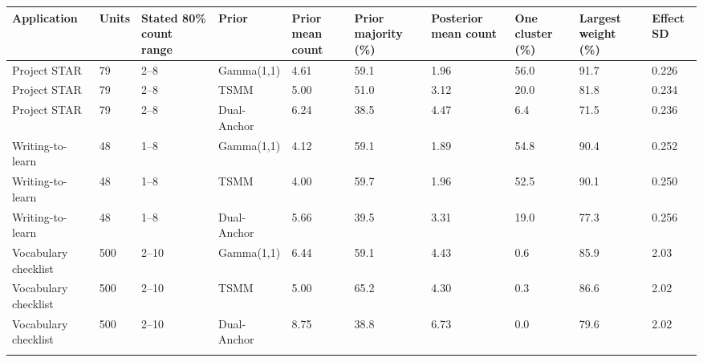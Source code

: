 \begin{longtable}{llllllllll}
\toprule
Application & Units & Stated 80\% count range & Prior & Prior mean count & Prior majority (\%) & Posterior mean count & One cluster (\%) & Largest weight (\%) & Effect SD \\
\midrule\endhead
Project STAR & 79 & 2–8 & Gamma(1,1) & 4.61 & 59.1 & 1.96 & 56.0 & 91.7 & 0.226 \\ \addlinespace[3pt]
Project STAR & 79 & 2–8 & TSMM & 5.00 & 51.0 & 3.12 & 20.0 & 81.8 & 0.234 \\ \addlinespace[3pt]
Project STAR & 79 & 2–8 & Dual-Anchor & 6.24 & 38.5 & 4.47 & 6.4 & 71.5 & 0.236 \\ \addlinespace[3pt]
Writing-to-learn & 48 & 1–8 & Gamma(1,1) & 4.12 & 59.1 & 1.89 & 54.8 & 90.4 & 0.252 \\ \addlinespace[3pt]
Writing-to-learn & 48 & 1–8 & TSMM & 4.00 & 59.7 & 1.96 & 52.5 & 90.1 & 0.250 \\ \addlinespace[3pt]
Writing-to-learn & 48 & 1–8 & Dual-Anchor & 5.66 & 39.5 & 3.31 & 19.0 & 77.3 & 0.256 \\ \addlinespace[3pt]
Vocabulary checklist & 500 & 2–10 & Gamma(1,1) & 6.44 & 59.1 & 4.43 & 0.6 & 85.9 & 2.03 \\ \addlinespace[3pt]
Vocabulary checklist & 500 & 2–10 & TSMM & 5.00 & 65.2 & 4.30 & 0.3 & 86.6 & 2.02 \\ \addlinespace[3pt]
Vocabulary checklist & 500 & 2–10 & Dual-Anchor & 8.75 & 38.8 & 6.73 & 0.0 & 79.6 & 2.02 \\ \addlinespace[3pt]
\bottomrule\end{longtable}
